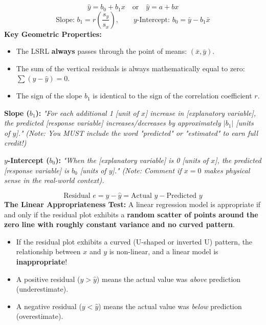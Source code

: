 \begin{lessonbox}
\begin{equation}
  \hat{y} = b_0 + b_1 x \quad \text{or} \quad \hat{y} = a + bx
\end{equation}
\begin{equation}
  \text{Slope: } b_1 = r\left(\frac{s_y}{s_x}\right), \qquad y\text{-Intercept: } b_0 = \bar{y} - b_1 \bar{x}
\end{equation}
\textbf{Key Geometric Properties:}
\begin{itemize}[leftmargin=1.2em]
  \item The LSRL \textbf{always} passes through the point of means: $(\bar{x}, \bar{y})$.
  \item The sum of the vertical residuals is always mathematically equal to zero: $\sum (y - \hat{y}) = 0$.
  \item The sign of the slope $b_1$ is identical to the sign of the correlation coefficient $r$.
\end{itemize}
\end{lessonbox}

\begin{frqrubricbox}
\textbf{Slope ($b_1$):}
\textit{"For each additional 1 [unit of $x$] increase in [explanatory variable], the predicted [response variable] increases/decreases by approximately $|b_1|$ [units of $y$]."}
\textit{(Note: You MUST include the word "predicted" or "estimated" to earn full credit!)}

\textbf{$y$-Intercept ($b_0$):}
\textit{"When the [explanatory variable] is 0 [units of $x$], the predicted [response variable] is $b_0$ [units of $y$]."}
\textit{(Note: Comment if $x=0$ makes physical sense in the real-world context).}
\end{frqrubricbox}

\begin{lessonbox}
\begin{equation}
  \text{Residual } e = y - \hat{y} = \text{Actual } y - \text{Predicted } y
\end{equation}
\textbf{The Linear Appropriateness Test:}
A linear regression model is appropriate if and only if the residual plot exhibits a \textbf{random scatter of points around the zero line with roughly constant variance and no curved pattern}.
\begin{itemize}[leftmargin=1.2em]
  \item If the residual plot exhibits a curved (U-shaped or inverted U) pattern, the relationship between $x$ and $y$ is non-linear, and a linear model is \textbf{inappropriate}!
  \item A positive residual ($y > \hat{y}$) means the actual value was \textit{above} prediction (underestimate).
  \item A negative residual ($y < \hat{y}$) means the actual value was \textit{below} prediction (overestimate).
\end{itemize}
\end{lessonbox}

